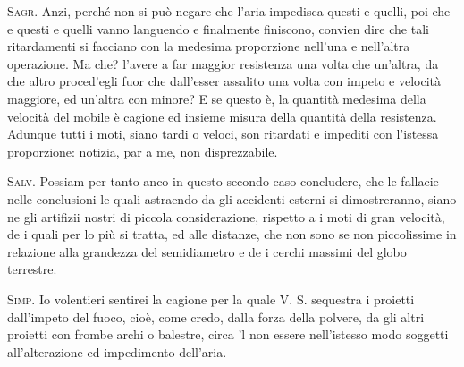 \documentclass[11pt,twoside,openany]{book}
\newcommand{\speaker}[1]{\textcolor{rubric}{\textsc{#1}}\space}
\begin{document}
\speaker{Sagr.} Anzi, perché non si può negare che l'aria impedisca questi e quelli, poi che e questi e quelli vanno languendo e finalmente finiscono, convien dire che tali ritardamenti si facciano con la medesima proporzione nell'una e nell'altra operazione. Ma che? l'avere a far maggior resistenza una volta che un'altra, da che altro proced'egli fuor che dall'esser assalito una volta con impeto e velocità maggiore, ed un'altra con minore? E se questo è, la quantità medesima della velocità del mobile è cagione ed insieme misura della quantità della resistenza. Adunque tutti i moti, siano tardi o veloci, son ritardati e impediti con l'istessa proporzione: notizia, par a me, non disprezzabile.

\speaker{Salv.} Possiam per tanto anco in questo secondo caso concludere, che le fallacie nelle conclusioni le quali astraendo da gli accidenti esterni si dimostreranno, siano ne gli artifizii nostri di piccola considerazione, rispetto a i moti di gran velocità, de i quali per lo più si tratta, ed alle distanze, che non sono se non piccolissime in relazione alla grandezza del semidiametro e de i cerchi massimi del globo terrestre.

\speaker{Simp.} Io volentieri sentirei la cagione per la quale V. S. sequestra i proietti dall'impeto del fuoco, cioè, come credo, dalla forza della polvere, da gli altri proietti con frombe archi o balestre, circa 'l non essere nell'istesso modo soggetti all'alterazione ed impedimento dell'aria.
\end{document}
